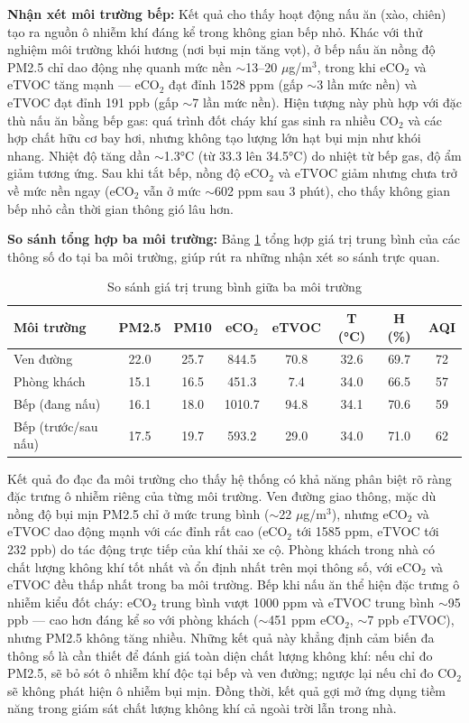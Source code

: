 \documentclass[../DoAn.tex]{subfiles}
\begin{document}
\textbf{Nhận xét môi trường bếp:} Kết quả cho thấy hoạt động nấu ăn (xào, chiên) tạo ra nguồn ô nhiễm khí đáng kể trong không gian bếp nhỏ. Khác với thử nghiệm môi trường khói hương (nơi bụi mịn tăng vọt), ở bếp nấu ăn nồng độ PM2.5 chỉ dao động nhẹ quanh mức nền $\sim$13--20 $\mu$g/m$^3$, trong khi eCO$_2$ và eTVOC tăng mạnh — eCO$_2$ đạt đỉnh 1528 ppm (gấp $\sim$3 lần mức nền) và eTVOC đạt đỉnh 191 ppb (gấp $\sim$7 lần mức nền). Hiện tượng này phù hợp với đặc thù nấu ăn bằng bếp gas: quá trình đốt cháy khí gas sinh ra nhiều CO$_2$ và các hợp chất hữu cơ bay hơi, nhưng không tạo lượng lớn hạt bụi mịn như khói nhang. Nhiệt độ tăng dần $\sim$1.3°C (từ 33.3 lên 34.5°C) do nhiệt từ bếp gas, độ ẩm giảm tương ứng. Sau khi tắt bếp, nồng độ eCO$_2$ và eTVOC giảm nhưng chưa trở về mức nền ngay (eCO$_2$ vẫn ở mức $\sim$602 ppm sau 3 phút), cho thấy không gian bếp nhỏ cần thời gian thông gió lâu hơn.

\textbf{So sánh tổng hợp ba môi trường:} Bảng \ref{table:so_sanh_moi_truong} tổng hợp giá trị trung bình của các thông số đo tại ba môi trường, giúp rút ra những nhận xét so sánh trực quan.

\begin{table}[H]
\centering
\caption{So sánh giá trị trung bình giữa ba môi trường}
\label{table:so_sanh_moi_truong}
\small
\begin{tabularx}{\textwidth}{|X|c|c|c|c|c|c|c|}
\hline
\textbf{Môi trường} & \textbf{PM2.5} & \textbf{PM10} & \textbf{eCO$_2$} & \textbf{eTVOC} & \textbf{T (°C)} & \textbf{H (\%)} & \textbf{AQI} \\
\hline
Ven đường & 22.0 & 25.7 & 844.5 & 70.8 & 32.6 & 69.7 & 72 \\
\hline
Phòng khách & 15.1 & 16.5 & 451.3 & 7.4 & 34.0 & 66.5 & 57 \\
\hline
Bếp (đang nấu) & 16.1 & 18.0 & 1010.7 & 94.8 & 34.1 & 70.6 & 59 \\
\hline
Bếp (trước/sau nấu) & 17.5 & 19.7 & 593.2 & 29.0 & 34.0 & 71.0 & 62 \\
\hline
\end{tabularx}
\end{table}

Kết quả đo đạc đa môi trường cho thấy hệ thống có khả năng phân biệt rõ ràng đặc trưng ô nhiễm riêng của từng môi trường. Ven đường giao thông, mặc dù nồng độ bụi mịn PM2.5 chỉ ở mức trung bình ($\sim$22 $\mu$g/m$^3$), nhưng eCO$_2$ và eTVOC dao động mạnh với các đỉnh rất cao (eCO$_2$ tới 1585 ppm, eTVOC tới 232 ppb) do tác động trực tiếp của khí thải xe cộ. Phòng khách trong nhà có chất lượng không khí tốt nhất và ổn định nhất trên mọi thông số, với eCO$_2$ và eTVOC đều thấp nhất trong ba môi trường. Bếp khi nấu ăn thể hiện đặc trưng ô nhiễm kiểu đốt cháy: eCO$_2$ trung bình vượt 1000 ppm và eTVOC trung bình $\sim$95 ppb — cao hơn đáng kể so với phòng khách ($\sim$451 ppm eCO$_2$, $\sim$7 ppb eTVOC), nhưng PM2.5 không tăng nhiều. Những kết quả này khẳng định cảm biến đa thông số là cần thiết để đánh giá toàn diện chất lượng không khí: nếu chỉ đo PM2.5, sẽ bỏ sót ô nhiễm khí độc tại bếp và ven đường; ngược lại nếu chỉ đo CO$_2$ sẽ không phát hiện ô nhiễm bụi mịn. Đồng thời, kết quả gợi mở ứng dụng tiềm năng trong giám sát chất lượng không khí cả ngoài trời lẫn trong nhà.
\end{document}
